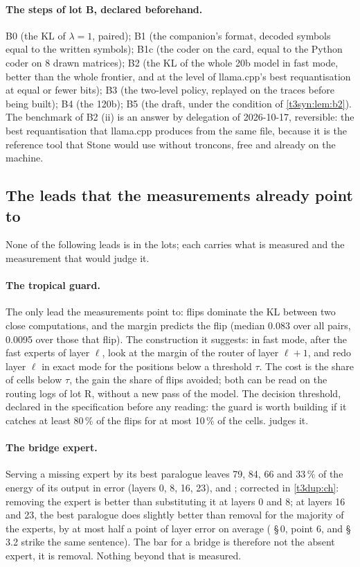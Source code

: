 \paragraph{The steps of lot B, declared beforehand.} B0 (the KL of $\lambda = 1$, paired); B1 (the companion's format, decoded symbols equal to the written symbols); B1c (the coder on the card, equal to the Python coder on 8 drawn matrices); B2 (the KL of the whole 20b model in fast mode, better than the whole frontier, and at the level of llama.cpp's best requantisation at equal or fewer bits); B3 (the two-level policy, replayed on the traces before being built); B4 (the 120b); B5 (the draft, under the condition of \cref{t3syn:lem:b2}). The benchmark of B2 (ii) is an answer by delegation of 2026-10-17, reversible: the best requantisation that llama.cpp produces from the same file, because it is the reference tool that Stone would use without troncons, free and already on the machine.

\subsection{The leads that the measurements already point to}

None of the following leads is in the lots; each carries what is measured and the measurement that would judge it.

\paragraph{The tropical guard.} The only lead the measurements point to: flips dominate the KL between two close computations, and the margin predicts the flip (median 0.083 over all pairs, 0.0095 over those that flip). The construction it suggests: in fast mode, after the fast experts of layer $\ell$, look at the margin of the router of layer $\ell + 1$, and redo layer $\ell$ in exact mode for the positions below a threshold $\tau$. The cost is the share of cells below $\tau$, the gain the share of flips avoided; both can be read on the routing logs of lot R, without a new pass of the model. The decision threshold, declared in the specification before any reading: the guard is worth building if it catches at least 80\,\% of the flips for at most 10\,\% of the cells.  judges it.

\paragraph{The bridge expert.} Serving a missing expert by its best paralogue leaves 79, 84, 66 and 33\,\% of the energy of its output in error (layers 0, 8, 16, 23), and ; corrected in \cref{t3dup:ch}: removing the expert is better than substituting it at layers 0 and 8; at layers 16 and 23, the best paralogue does slightly better than removal for the majority of the experts, by at most half a point of layer error on average ( §\,0, point 6, and  §\,3.2 strike the same sentence). The bar for a bridge is therefore not the absent expert, it is removal. Nothing beyond that is measured.

